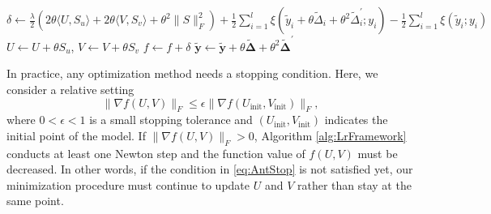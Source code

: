 \documentclass[11pt,twoside]{article}
\newcommand{\bsym}[1]{\ensuremath{\boldsymbol{#1}}}
\begin{document}
\begin{algorithm}
\begin{algorithmic}[1]
                \State $\delta \gets \frac{\lambda}{2}\left( 2\theta \langle U, S_u \rangle + 2\theta \langle V, S_v \rangle + \theta^2\|S\|_F^2 \right) + \frac{1}{2} \sum_{i=1}^l \xi(\tilde{y}_i+\theta\tilde{\Delta}_i+{\theta}^2\tilde{\Delta}_i^\prime;y_i) - \frac{1}{2}\sum_{i=1}^l \xi(\tilde{y}_i;y_i)$
                    \State $U \gets U +\theta S_u$, $V \gets V +\theta S_v$
                    \State $f \gets f+ \delta$
                    \State $\bsym{\tilde{y}} \gets \bsym{\tilde{y}}+\theta\bsym{\tilde{\Delta}} +{\theta}^2 \bsym{\tilde{\Delta}}^\prime$
                \EndIf
            \EndFor
        \EndFor
    \end{algorithmic}
\end{algorithm}

In practice, any optimization method needs a stopping condition.
Here, we consider a relative setting
\begin{equation}
    \|\nabla f(U,V)\|_F \le \epsilon \|\nabla f(U_{\text{init}},V_{\text{init}})\|_F,
    \label{eq:AntStop}
\end{equation}
where $0<\epsilon<1$ is a small stopping tolerance and $(U_{\text{init}},V_{\text{init}})$ indicates the initial point of the model. 
If $\|\nabla f(U,V)\|_F >0$, Algorithm \ref{alg:LrFramework} conducts at least one Newton step and the function value of $f(U,V)$ must be decreased. In other words, if the condition in \eqref{eq:AntStop} is not satisfied yet, our minimization procedure must continue to update $U$ and $V$ rather than stay at the same point.
\end{document}
